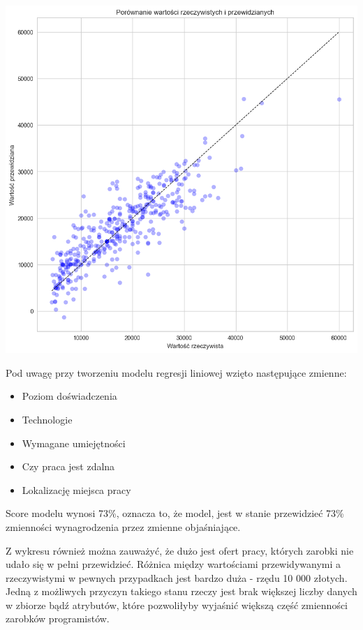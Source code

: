 \documentclass{article}
\begin{document}
\begin{center}
    \includegraphics[scale=0.5]{img/model_pred_1.png}
\end{center}

Pod uwagę przy tworzeniu modelu regresji liniowej wzięto następujące zmienne:
\begin{itemize}
    \item Poziom doświadczenia
    \item Technologie
    \item Wymagane umiejętności
    \item Czy praca jest zdalna
    \item Lokalizację miejsca pracy
\end{itemize}

Score modelu wynosi 73\%, oznacza to, że model, jest w stanie przewidzieć 73\% zmienności wynagrodzenia przez zmienne objaśniające.

Z wykresu również można zauważyć, że dużo jest ofert pracy, których zarobki nie udało się w pełni przewidzieć.
Różnica między wartościami przewidywanymi a rzeczywistymi w pewnych przypadkach jest bardzo duża - rzędu 10 000 złotych.
Jedną z możliwych przyczyn takiego stanu rzeczy jest brak większej liczby danych w zbiorze bądź atrybutów,
które pozwoliłyby wyjaśnić większą część zmienności zarobków programistów.
\end{document}

